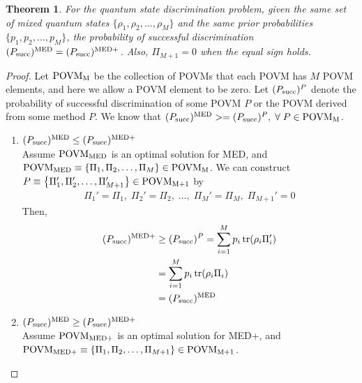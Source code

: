 \documentclass[11pt]{article}
\newtheorem{theorem}{Theorem}
\newcommand{\psucc}{P_{\textnormal{succ}}}
\newcommand{\povm}[1]{\textnormal{POVM}_{\textnormal{#1}}}
\newcommand{\PiSet}[1]{\left\{ \Pi_1, \Pi_2, \dots, \Pi_{#1} \right\}}
\newcommand{\PiSetPrime}[1]{\left\{ \Pi_1', \Pi_2', \dots, \Pi_{#1}' \right\}}
\newcommand{\supmed}{^{\textnormal{MED}}}
\newcommand{\supmedplus}{^{\textnormal{MED+}}}
\begin{document}
\begin{theorem} \label{thm:med_medplus}
    For the quantum state discrimination problem, given the same set of
    mixed quantum states $\{ \rho_{1}, \rho_{2}, \dots, \rho_{M} \}$
    and the same prior probabilities $\{p_{1}, p_{2}, \dots, p_{M}\}$,
    the probability of successful discrimination
    $(\psucc)\supmed = (\psucc)\supmedplus$.
    Also, $\Pi_{M+1} = 0$ when the equal sign holds.
\end{theorem}

\begin{proof}
    \noindent

    Let $\povm{M}$ be the collection of POVMs that each POVM has $M$ POVM
    elements, and here we allow a POVM element to be zero.
    Let $(\psucc)^{P}$ denote the probability of successful discrimination of
    some POVM $P$ or the POVM derived from some method $P$.
    We know that $(\psucc)\supmed >= (\psucc)^{P}, \; \forall \; P \in \povm{M}$.
    \begin{enumerate}
        \item $(\psucc)\supmed \leq (\psucc)\supmedplus$\\
              Assume $\povm{MED}$ is an optimal solution for MED, and\\
              $\povm{MED} \equiv \PiSet{M} \in \povm{M}$.
              We can construct $P \equiv \PiSetPrime{M+1} \in \povm{M+1}$
              by
              \begin{align*}
                  \Pi_{1}' = \Pi_{1}, \; \Pi_{2}' = \Pi_{2}, \; \dots,
                  \; \Pi_{M}' = \Pi_{M}, \; \Pi_{M+1}' = 0
              \end{align*}
              Then,
              \begin{align}
                  (\psucc)\supmedplus & \geq (\psucc)^{P}
                  = \sum_{i=1}^{M} p_{i} \operatorname{tr}(\rho_{i} \Pi_{i}')                      \\
                                      & = \sum_{i=1}^{M} p_{i} \operatorname{tr}(\rho_{i} \Pi_{i}) \\
                                      & = (\psucc)\supmed
              \end{align}
        \item $(\psucc)\supmed \geq (\psucc)\supmedplus$\\
              Assume $\povm{MED+}$ is an optimal solution for MED+, and\\
              $\povm{MED+} \equiv \PiSet{M+1} \in \povm{M+1}$.

\end{enumerate}
\end{proof}
\end{document}
